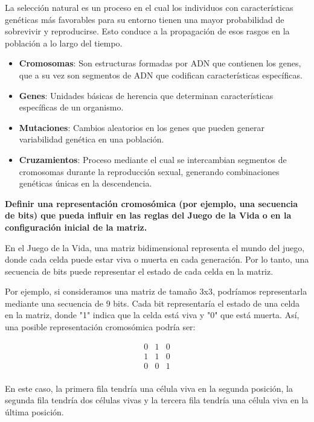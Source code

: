 La selección natural es un proceso en el cual los individuos con características genéticas más favorables para su entorno tienen una mayor probabilidad de sobrevivir y reproducirse. Esto conduce a la propagación de esos rasgos en la población a lo largo del tiempo.

\begin{itemize}
    \item \textbf{Cromosomas}: Son estructuras formadas por ADN que contienen los genes, que a su vez son segmentos de ADN que codifican características específicas.
  
    \item \textbf{Genes}: Unidades básicas de herencia que determinan características específicas de un organismo.
  
    \item \textbf{Mutaciones}: Cambios aleatorios en los genes que pueden generar variabilidad genética en una población.
  
    \item \textbf{Cruzamientos}: Proceso mediante el cual se intercambian segmentos de cromosomas durante la reproducción sexual, generando combinaciones genéticas únicas en la descendencia.
\end{itemize}

\textbf{Definir una representación cromosómica (por ejemplo, una secuencia de bits) que pueda influir en las reglas del Juego de la Vida o en la configuración inicial de la matriz.}

 En el Juego de la Vida, una matriz bidimensional representa el mundo del juego, donde cada celda puede estar viva o muerta en cada generación. Por lo tanto, una secuencia de bits puede representar el estado de cada celda en la matriz.

Por ejemplo, si consideramos una matriz de tamaño 3x3, podríamos representarla mediante una secuencia de 9 bits. Cada bit representaría el estado de una celda en la matriz, donde "1" indica que la celda está viva y "0" que está muerta. Así, una posible representación cromosómica podría ser:

\[
\begin{matrix}
    0 & 1 & 0 \\
    1 & 1 & 0 \\
    0 & 0 & 1 \\
    \end{matrix}
\]

En este caso, la primera fila tendría una célula viva en la segunda posición, la segunda fila tendría dos células vivas y la tercera fila tendría una célula viva en la última posición.

